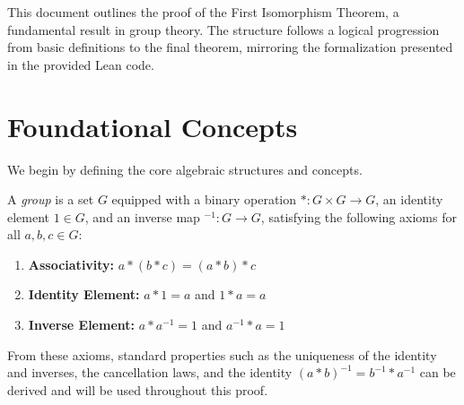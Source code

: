 %




\maketitle

This document outlines the proof of the First Isomorphism Theorem, a fundamental result in group theory. The structure follows a logical progression from basic definitions to the final theorem, mirroring the formalization presented in the provided Lean code.

\section{Foundational Concepts}

We begin by defining the core algebraic structures and concepts.

\begin{definition}[Group]
A \emph{group} is a set $G$ equipped with a binary operation $*: G \times G \to G$, an identity element $1 \in G$, and an inverse map $^{-1}: G \to G$, satisfying the following axioms for all $a, b, c \in G$:
\begin{enumerate}
    \item \textbf{Associativity:} $a * (b * c) = (a * b) * c$
    \item \textbf{Identity Element:} $a * 1 = a$ and $1 * a = a$
    \item \textbf{Inverse Element:} $a * a^{-1} = 1$ and $a^{-1} * a = 1$
\end{enumerate}
From these axioms, standard properties such as the uniqueness of the identity and inverses, the cancellation laws, and the identity $(a*b)^{-1} = b^{-1}*a^{-1}$ can be derived and will be used throughout this proof.
\end{definition}

